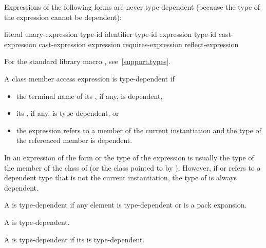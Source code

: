 \pnum
Expressions of the following forms are never type-dependent (because the type
of the expression cannot be dependent):

\begin{ncsimplebnf}
literal\br
{} unary-expression\br
{} \terminal{(} type-id \terminal{)}\br
{}  \terminal{(} identifier \terminal{)}\br
{} \terminal{(} type-id \terminal{)}\br
{} \terminal{(} expression \terminal{)}\br
{} \terminal{(} type-id \terminal{)}\br
\opt{\terminal{::}}  cast-expression\br
\opt{\terminal{::}}  \terminal{[} \terminal{]} cast-expression\br
{} \br
{} \terminal{(} expression \terminal{)}\br
requires-expression\br
reflect-expression
\end{ncsimplebnf}

\begin{note}
For the standard library macro ,
see~\ref{support.types}.
\end{note}

\pnum
A class member access expression is
type-dependent if
\begin{itemize}
\item
the terminal name of its , if any, is dependent,
\item
its , if any, is type-dependent, or
\item
the expression refers to a member of the current instantiation and
the type of the referenced member is dependent.
\end{itemize}
\begin{note}
In an expression of the form
or
the type of the expression is usually the type of the member
of the class of
(or the class pointed to by
).
However, if
or
refers to a dependent type that is not the current instantiation,
the type of
is always dependent.
\end{note}

\pnum
A  is type-dependent if any element is
type-dependent or is a pack expansion.

\pnum
A  is type-dependent.

\pnum
A  is type-dependent
if its  is type-dependent.

